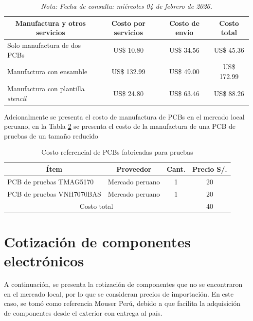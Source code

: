 \begin{table}[H]
\centering
\caption{Resumen comparativo de costos para tres alternativas de adquisición.}
\label{tab:jlcpcb_resumen_costos}
\begin{tabular}{|l|c|c|c|}
\hline
\multicolumn{1}{|c|}{Manufactura y otros servicios} & Costo por servicios & Costo de envío & Costo total \\
\hline
Solo manufactura de dos \ac{PCB}s & US\$ 10.80 & US\$ 34.56 & US\$ 45.36 \\
\hline
Manufactura con ensamble & US\$ 132.99 & US\$ 49.00 & US\$ 172.99 \\
\hline
Manufactura con plantilla \textit{stencil} & US\$ 24.80 & US\$ 63.46 & US\$ 88.26 \\
\hline
\end{tabular}
\caption*{\textit{Nota: Fecha de consulta: miércoles 04 de febrero de 2026.}}
\end{table}
Adcionalmente se presenta el costo de manufactura de \ac{PCB}s en el mercado local peruano, en la Tabla \ref{tab:costo_pcbs_pruebas} se presenta el costo de la manufactura de una \ac{PCB} de pruebas de un tamaño reducido 
\begin{table}[H]
\centering
\caption{Costo referencial de \ac{PCB}s fabricadas para pruebas}
\label{tab:costo_pcbs_pruebas}
\begin{tabular}{|l|c|c|c|}
\hline
\multicolumn{1}{|c|}{Ítem} & Proveedor & Cant. & Precio S/. \\
\hline
\ac{PCB} de pruebas TMAG5170 & Mercado peruano & 1 & 20 \\
\hline
\ac{PCB} de pruebas VNH7070BAS & Mercado peruano & 1 & 20 \\
\hline
\multicolumn{3}{|c|}{Costo total} & 40 \\
\hline
\end{tabular}
\end{table}

\section{Cotización de componentes electrónicos}

A continuación, se presenta la cotización de componentes que no se encontraron en el mercado local, por lo que se consideran precios de importación. En este caso, se tomó como referencia Mouser Perú, debido a que facilita la adquisición de componentes desde el exterior con entrega al país. \autocite{mouser_pe_componentes}

